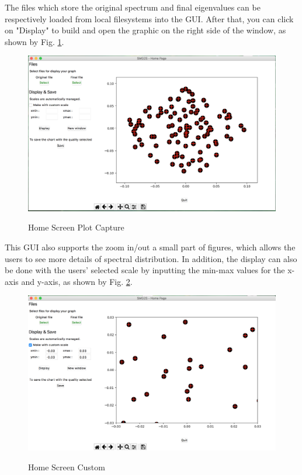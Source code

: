 The files which store the original spectrum and final eigenvalues can be respectively loaded from local filesystems into the GUI. After that, you can click on "Display" to build and open the graphic on the right side of the window, as shown by Fig. \ref{fig:Home Screen Plot Capture}.

\begin{figure}[htbp]
	\caption{Home Screen Plot Capture}
	\centering
	\includegraphics[width=6.2in]{fig/home_screen.png}
	\label{fig:Home Screen Plot Capture}
\end{figure}

This GUI also supports the zoom in/out a small part of figures, which allows the users to see more details of spectral distribution. In addition, the display can also be done with the users' selected scale by inputting the min-max values for the x-axis and y-axis, as shown by Fig. \ref{fig:Home Screen custom}.

\begin{figure}[htbp]
	\caption{Home Screen Custom}
	\centering
	\includegraphics[width=6.2in]{fig/home_screen_custom.png}
	\label{fig:Home Screen custom}
\end{figure}


